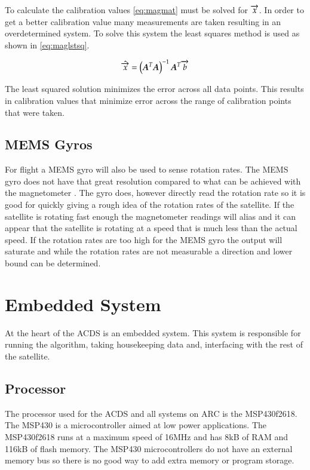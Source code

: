 To calculate the calibration values \autoref{eq:magmat} must be solved for $\overrightarrow{x}$. In order to get a better calibration value many measurements are taken resulting in an overdetermined system. To solve this system the least squares method is used as shown in \autoref{eq:maglstsq}.

\begin{equation}
    \hat{\overrightarrow{x}} = \left(\boldsymbol{A} ^T \boldsymbol{A} \right) ^ {-1} \boldsymbol{A} ^T \overrightarrow{b}
    \label{eq:maglstsq}
\end{equation}

The least squared solution minimizes the error across all data points. This results in calibration values that minimize error across the range of calibration points that were taken.

\subsection{\acs{MEMS} Gyros}

For flight a \ac{MEMS} gyro will also be used to sense rotation rates. The \ac{MEMS} gyro does not have that great resolution compared to what can be achieved with the magnetometer . The gyro does, however directly read the rotation rate so it is good for quickly giving a rough idea of the rotation rates of the satellite. If the satellite is rotating fast enough the magnetometer readings will alias and it can appear that the satellite is rotating at a speed that is much less than the actual speed. If the rotation rates are too high for the \ac{MEMS} gyro the output will saturate and while the rotation rates are not measurable a direction and lower bound can be determined.


\section{Embedded System}

At the heart of the \ac{ACDS} is an embedded system. This system is responsible for running the algorithm, taking housekeeping data and, interfacing with the rest of the satellite.

\subsection{Processor}

The processor used for the \ac{ACDS} and all systems on \ac{ARC} is the MSP430f2618. The MSP430 is a microcontroller aimed at low power applications. The MSP430f2618 runs at a maximum speed of 16MHz and has 8kB of RAM and 116kB of flash memory. The MSP430 microcontrollers do not have an external memory bus so there is no good way to add extra memory or program storage. 

